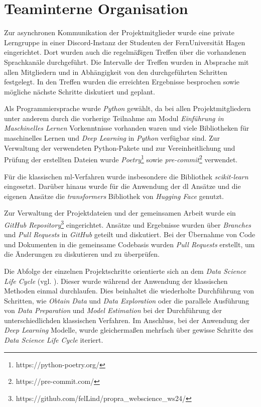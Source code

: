 \section{Teaminterne Organisation}

Zur asynchronen Kommunikation der Projektmitglieder wurde eine private Lerngruppe in einer Discord-Instanz der Studenten der FernUniversität Hagen eingerichtet.
Dort wurden auch die regelmäßigen Treffen über die vorhandenen Sprachkanäle durchgeführt.
Die Intervalle der Treffen wurden in Absprache mit allen Mitgliedern und in Abhängigkeit von den durchgeführten Schritten festgelegt.
In den Treffen wurden die erreichten Ergebnisse besprochen sowie mögliche nächste Schritte diskutiert und geplant.

Als Programmiersprache wurde \textit{Python} gewählt, da bei allen Projektmitgliedern unter anderem durch die vorherige Teilnahme am Modul \textit{Einführung in Maschinelles Lernen} Vorkenntnisse vorhanden waren und viele Bibliotheken für maschinelles Lernen und \textit{Deep Learning} in \textit{Python} verfügbar sind.
Zur Verwaltung der verwendeten Python-Pakete und zur Vereinheitlichung und Prüfung der erstellten Dateien wurde \textit{Poetry}\footnote{https://python-poetry.org/} sowie \textit{pre-commit}\footnote{https://pre-commit.com/} verwendet.

Für die klassischen \gls{ml}-Verfahren wurde insbesondere die Bibliothek \textit{scikit-learn} eingesetzt.
Darüber hinaus wurde für die Anwendung der \gls{dl} Ansätze und die eigenen Ansätze die \textit{transformers} Bibliothek von \textit{Hugging Face} genutzt.

Zur Verwaltung der Projektdateien und der gemeinsamen Arbeit wurde ein \textit{GitHub Repository}\footnote{https://github.com/felLind/propra\_webscience\_ws24/} eingerichtet.
Ansätze und Ergebnisse wurden über \textit{Branches} und \textit{Pull Requests} in \textit{GitHub} geteilt und diskutiert.
Bei der Übernahme von Code und Dokumenten in die gemeinsame Codebasis wurden \textit{Pull Requests} erstellt, um die Änderungen zu diskutieren und zu überprüfen.

Die Abfolge der einzelnen Projektschritte orientierte sich an dem \textit{Data Science Life Cycle} (vgl. \cite[Abb. 2]{Stodden2020}).
Dieser wurde während der Anwendung der klassischen Methoden einmal durchlaufen.
Dies beinhaltet die wiederholte Durchführung von Schritten, wie \textit{Obtain Data} und \textit{Data Exploration} oder die parallele Ausführung von \textit{Data Preparation} und \textit{Model Estimation} bei der Durchführung der unterschiedlichden klassischen Verfahren.
Im Anschluss, bei der Anwendung der \textit{Deep Learning} Modelle, wurde gleichermaßen mehrfach über gewisse Schritte des \textit{Data Science Life Cycle} iteriert.
